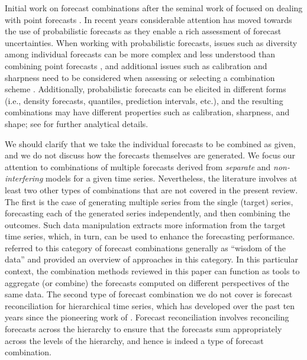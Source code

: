 \documentclass[a4paper,11pt]{article}
\begin{document}
Initial work on forecast combinations after the seminal work of \citet{Bates1969-yj} focused on dealing with point forecasts \citep[see, for example,][]{Clemen1989-fb,Timmermann2006-en}. In recent years considerable attention has moved towards the use of probabilistic forecasts \citep[e.g.,][]{Hall2007-lh,Gneiting2013-hl,Kapetanios2015-bb,Martin2021-yi} as they enable a rich assessment of forecast uncertainties. When working with probabilistic forecasts, issues such as diversity among individual forecasts can be more complex and less understood than combining point forecasts \citep{Ranjan2010-jl}, and additional issues such as calibration and sharpness need to be considered when assessing or selecting a combination scheme \citep{Gneiting2007-fr}. Additionally, probabilistic forecasts can be elicited in different forms (i.e., density forecasts, quantiles, prediction intervals, etc.), and the resulting combinations may have different properties such as calibration, sharpness, and shape; see \citet{Lichtendahl2013-rt} for further analytical details.

We should clarify that we take the individual forecasts to be combined as given, and we do not discuss how the forecasts themselves are generated. We focus our attention to combinations of multiple forecasts derived from \textit{separate} and \textit{non-interfering} models for a given time series. Nevertheless, the literature involves at least two other types of combinations that are not covered in the present review. The first is the case of generating multiple series from the single (target) series, forecasting each of the generated series independently, and then combining the outcomes. Such data manipulation extracts more information from the target time series, which, in turn, can be used to enhance the forecasting performance. \citet{Petropoulos2021-wisdom} referred to this category of forecast combinations generally as ``wisdom of the data'' and provided an overview of approaches in this category. In this particular context, the combination methods reviewed in this paper can function as tools to aggregate (or combine) the forecasts computed on different perspectives of the same data. The second type of forecast combination we do not cover is forecast reconciliation for hierarchical time series, which has developed over the past ten years since the pioneering work of \citet{Hyndman2011-sd}. Forecast reconciliation involves reconciling forecasts across the hierarchy to ensure that the forecasts sum appropriately across the levels of the hierarchy, and hence is indeed a type of forecast combination.
\end{document}
